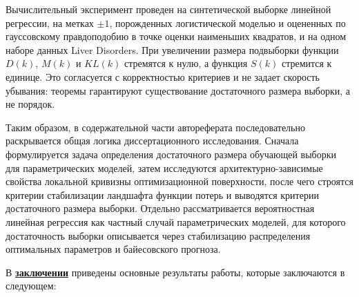 Вычислительный эксперимент проведен на синтетической выборке линейной регрессии, на метках $\pm 1$, порожденных логистической моделью и оцененных по гауссовскому правдоподобию в точке оценки наименьших квадратов, и на одном наборе данных Liver Disorders. При увеличении размера подвыборки функции $D(k)$, $M(k)$ и $KL(k)$ стремятся к нулю, а функция $S(k)$ стремится к единице. Это согласуется с корректностью критериев и не задает скорость убывания: теоремы гарантируют существование достаточного размера выборки, а не порядок.

Таким образом, в содержательной части автореферата последовательно раскрывается общая логика диссертационного исследования. Сначала формулируется задача определения достаточного размера обучающей выборки для параметрических моделей, затем исследуются архитектурно-зависимые свойства локальной кривизны оптимизационной поверхности, после чего строятся критерии стабилизации ландшафта функции потерь и выводятся критерии достаточного размера выборки. Отдельно рассматривается вероятностная линейная регрессия как частный случай параметрических моделей, для которого достаточность выборки описывается через стабилизацию распределения оптимальных параметров и байесовского прогноза.

\FloatBarrier
{}                                  %

В \underline{\textbf{заключении}} приведены основные результаты работы, которые заключаются в следующем:



